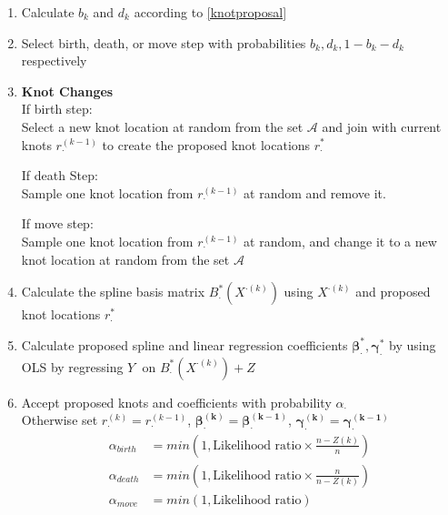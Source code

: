 \documentclass[11pt]{article}\usepackage[]{graphicx}\usepackage[]{color}
\begin{document}
\begin{enumerate}
\item
Calculate $b_k$ and $d_k$ according to \eqref{knotproposal} \\

\item
Select birth, death, or move step with probabilities $b_k,d_k,1-b_k-d_k$ respectively \\

\item
{\bf Knot Changes} \\
If birth step:\\
Select a new knot location at random from the set $\mathcal{A}$ and join with current knots $r_{\cdot}^{(k-1)}$ to create the proposed knot locations $r_{\cdot}^{*}$

If death Step:\\
Sample one knot location from $r_{\cdot}^{(k-1)}$ at random and remove it. 

If move step:\\
Sample one knot location from $r_{\cdot}^{(k-1)}$ at random, and change it to a new knot location at random from the set $\mathcal{A}$


\item
Calculate the spline basis matrix $B^*_{\cdot}(X^{\cdot(k)})$ using $X^{\cdot(k)}$ and proposed knot locations $r_{\cdot}^{*}$

\item
Calculate proposed spline and linear regression coefficients $\boldsymbol{\beta^*_{\cdot}},\boldsymbol{\gamma^*_{\cdot}}$ by using OLS by regressing $Y^{\cdot}$ on $B^*_{\cdot}(X^{\cdot(k)}) + Z$

\item
Accept proposed knots and coefficients with probability $\alpha_{\cdot}$ \\

Otherwise set $r_{\cdot}^{(k)}=r_{\cdot}^{(k-1)}$, $\boldsymbol{\beta^{(k)}_{\cdot}} =\boldsymbol{\beta^{(k-1)}_{\cdot}}$, $\boldsymbol{\gamma^{(k)}_{\cdot}} =\boldsymbol{\gamma^{(k-1)}_{\cdot}}$\\

\begin{align*}
\alpha_{birth} &= min\left(1, \text{Likelihood ratio}\times \frac{n-Z(k)}{n} \right) \\
\alpha_{death} &= min\left(1, \text{Likelihood ratio}\times \frac{n}{n-Z(k)} \right) \\
\alpha_{move} &= min\left(1, \text{Likelihood ratio}\right) 
\end{align*}


\end{enumerate}
\end{document}
